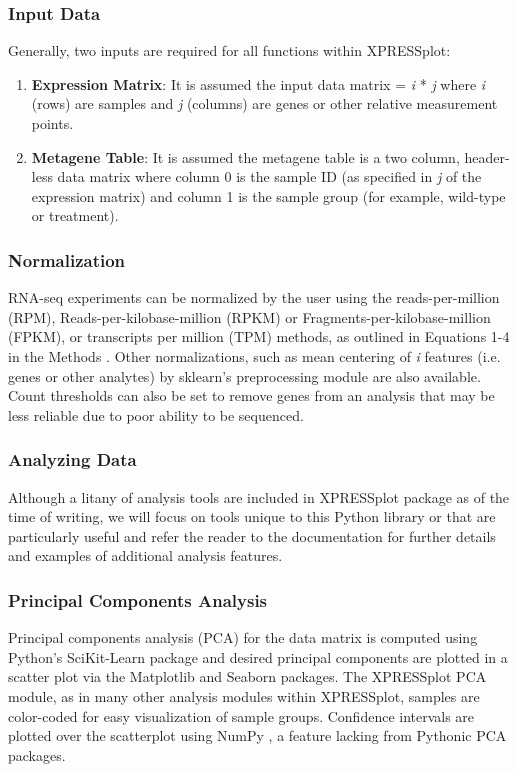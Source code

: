 \documentclass[10pt, oneside]{article}
\begin{document}
\subsubsection{Input Data}
Generally, two inputs are required for all functions within XPRESSplot:

\begin{enumerate}
  \item \textbf{Expression Matrix}: It is assumed the input data matrix = \textit{i} * \textit{j} where \textit{i} (rows) are samples and \textit{j} (columns) are genes or other relative measurement points.
  \item \textbf{Metagene Table}: It is assumed the metagene table is a two column, header-less data matrix where column 0 is the sample ID (as specified in \textit{j} of the expression matrix) and column 1 is the sample group (for example, wild-type or treatment).
\end{enumerate}

\subsubsection{Normalization}
RNA-seq experiments can be normalized by the user using the reads-per-million (RPM), Reads-per-kilobase-million (RPKM) or Fragments-per-kilobase-million (FPKM), or transcripts per million (TPM) methods, as outlined in Equations 1-4 in the Methods \cite{evans_briefbio}. Other normalizations, such as mean centering of \textit{i} features (i.e. genes or other analytes) by sklearn's preprocessing module \cite{scikit_learn} are also available. Count thresholds can also be set to remove genes from an analysis that may be less reliable due to poor ability to be sequenced.

\subsubsection{Analyzing Data}

Although a litany of analysis tools are included in XPRESSplot package as of the time of writing, we will focus on tools unique to this Python library or that are particularly useful and refer the reader to the documentation for further details and examples of additional analysis features.

\subsubsection{Principal Components Analysis}
Principal components analysis (PCA) for the data matrix is computed using Python's SciKit-Learn package \cite{scikit_learn} and desired principal components are plotted in a scatter plot via the Matplotlib \cite{matplotlib} and Seaborn \cite{seaborn} packages. The XPRESSplot PCA module, as in many other analysis modules within XPRESSplot, samples are color-coded for easy visualization of sample groups. Confidence intervals are plotted over the scatterplot using NumPy \cite{numpy1, numpy2}, a feature lacking from Pythonic PCA packages.
\end{document}
